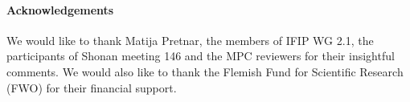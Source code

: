 \documentclass{jfp}
\begin{document}
%
%



\paragraph{Acknowledgements}
We would like to thank Matija Pretnar, the members of IFIP WG 2.1, the
participants of Shonan meeting 146 and the MPC reviewers for their insightful
comments. We would also like to thank the Flemish Fund for Scientific Research (FWO) for their financial support.




%
\end{document}
